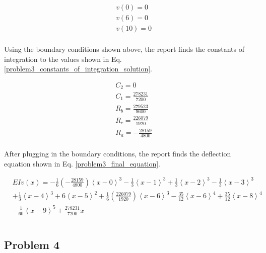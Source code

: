 \documentclass[a4paper]{article}
\begin{document}
\begin{equation}
\begin{split}
	& v(0) = 0 \\
	& v(6) = 0 \\
	& v(10) = 0 \\
\end{split}
\label{problem3_constants_of_integration}
\end{equation}

Using the boundary conditions shown above, the report finds the constants of integration to the values shown in Eq. \ref{problem3_constants_of_integration_solution}.

\begin{equation}
\begin{split}
	& C_2 = 0 \\
	& C_1 = \frac{278231}{7200} \\
	& R_b =\frac{279523}{9600} \\
	& R_c = \frac{226079}{1920}\\
	& R_a = -\frac{28159}{4800} \\
\end{split}
\label{problem3_constants_of_integration_solution}
\end{equation}

After plugging in the boundary conditions, the report finds the deflection equation shown in Eq. \ref{problem3_final_equation}.

\begin{equation}
\begin{split}
  & EI v(x) = -\frac{1}{6}\left(-\frac{28159}{4800}\right)\left<x-0\right>^3 - \frac{1}{3}\left<x-1\right>^3 +  \frac{1}{3}\left<x-2\right>^3 - \frac{1}{3}\left<x-3\right>^3 \\
& +  \frac{1}{3}\left<x-4\right>^3 + 6\left<x-5\right>^2 + \frac{1}{6}\left(\frac{226079}{1920}\right)\left<x-6\right>^3 -  \frac{35}{12}\left<x-6\right>^4 + \frac{35}{12}\left<x-8\right>^4  \\
& - \frac{1}{60}\left<x-9\right>^5 + \frac{278231}{7200}x \\\\
\end{split}
\label{problem3_final_equation}
\end{equation}





\subsection{Problem 4}
\end{document}
